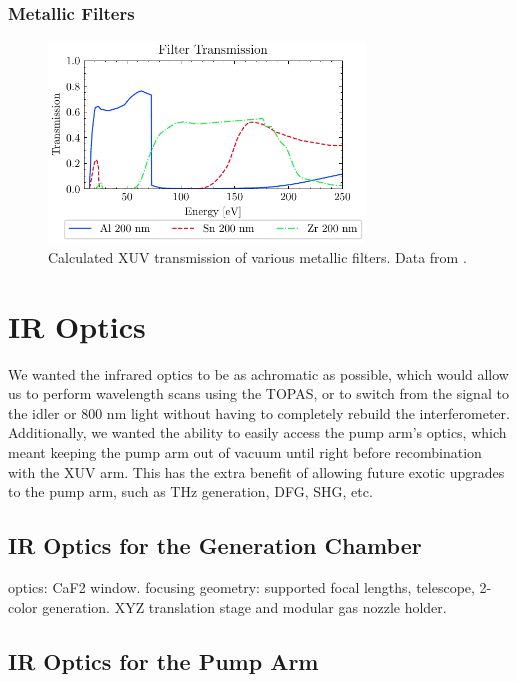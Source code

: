 \subsubsection{Metallic Filters}

\begin{figure}
	\centering
	\includegraphics[width=0.75\textwidth]{figures/chap2/Filter_transmission_CXRO.pdf}
	\caption{Calculated XUV transmission of various metallic filters. Data from \cite{gulliksonCXROXRayInteractions}.}
	\label{fig:Filter_transmission_CXRO}
\end{figure}

\section{IR Optics}


We wanted the infrared optics to be as achromatic as possible, which would allow us to perform wavelength scans using the TOPAS, or to switch from the signal to the idler or 800 nm light without having to completely rebuild the interferometer. Additionally, we wanted the ability to easily access the pump arm's optics, which meant keeping the pump arm out of vacuum until right before recombination with the XUV arm. This has the extra benefit of allowing future exotic upgrades to the pump arm, such as THz generation, DFG, SHG, etc.


\subsection{IR Optics for the Generation Chamber}

optics: CaF2 window. focusing geometry: supported focal lengths, telescope, 2-color generation. XYZ translation stage and modular gas nozzle holder.

\subsection{IR Optics for the Pump Arm}

